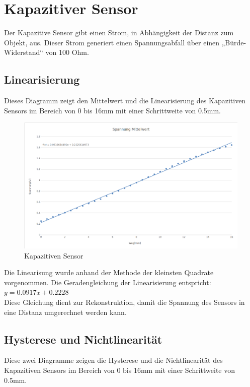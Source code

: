 \section{Kapazitiver Sensor}
Der Kapazitive Sensor gibt einen Strom, in Abhängigkeit der Distanz zum Objekt, aus. Dieser
Strom generiert einen Spannungsabfall über einen „Bürde-Widerstand“ von 100 Ohm.\\

\subsection{Linearisierung}
Dieses Diagramm zeigt den Mittelwert und die Linearisierung des Kapazitiven Sensors im Bereich von 0 bis 16mm mit einer Schrittweite von 0.5mm.
\begin{figure}[H]
    \centering
    \includegraphics[scale=0.5]{pic/linearisierung.png}
    \caption{Kapazitiven Sensor}
    \label{fig:kapazitiv}
\end{figure}

Die Linearisung wurde anhand der Methode der kleinsten Quadrate vorgenommen. Die Geradengleichung der Linearisierung entspricht: $y = 0.0917x + 0.2228$\\
Diese Gleichung dient zur Rekonstruktion, damit die Spannung des Sensors in eine Distanz umgerechnet werden kann.


\subsection{Hysterese und Nichtlinearität}
Diese zwei Diagramme zeigen die Hysterese und die Nichtlinearität des Kapazitiven Sensors im Bereich von 0 bis 16mm mit einer Schrittweite von 0.5mm.

